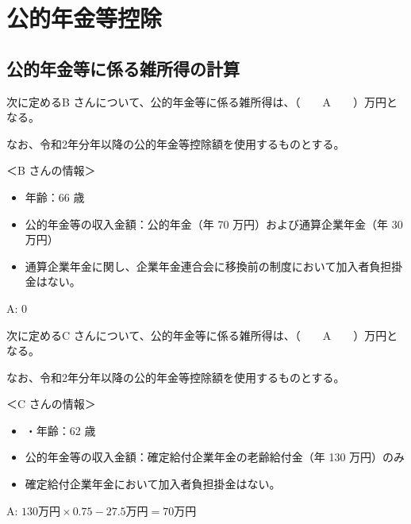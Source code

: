 \section{公的年金等控除}

\subsection{公的年金等に係る雑所得の計算}

\begin{fillblank}[年金1 2018 問題1(3)\textcircled{4}（改題）]
次に定めるB さんについて、公的年金等に係る雑所得は、（　　A　　）万円となる。

なお、令和2年分年以降の公的年金等控除額を使用するものとする。

＜B さんの情報＞
\begin{itemize}
  \item 年齢：66 歳
  \item 公的年金等の収入金額：公的年金（年 70 万円）および通算企業年金（年 30 万円）
  \item 通算企業年金に関し、企業年金連合会に移換前の制度において加入者負担掛金はない。
\end{itemize}
\end{fillblank}

\begin{answerbox}
  A: 0
\end{answerbox}

\begin{fillblank}[年金1 2018 問題1(3)\textcircled{5}（改題）]
  次に定めるC さんについて、公的年金等に係る雑所得は、（　　A　　）万円となる。

  なお、令和2年分年以降の公的年金等控除額を使用するものとする。

＜C さんの情報＞
\begin{itemize}
  \item ・年齢：62 歳
\item 公的年金等の収入金額：確定給付企業年金の老齢給付金（年 130 万円）のみ
\item 確定給付企業年金において加入者負担掛金はない。
\end{itemize}

\end{fillblank}

\begin{answerbox}
  A: $130万円 \times 0.75 - 27.5万円 = 70万円$
\end{answerbox}

